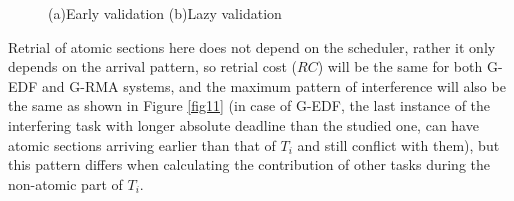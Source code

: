 \documentclass[a4paper,english]{article}
\begin{document}
%
\begin{figure}
\centering{}\caption{\label{fig12}(a)Early validation (b)Lazy validation}

\end{figure}


Retrial of atomic sections here does not depend on the scheduler,
rather it only depends on the arrival pattern, so retrial
cost ($RC$) will be the same for both G-EDF and G-RMA
systems, and the maximum pattern of interference will also be the
same as shown in Figure \ref{fig11} (in case of G-EDF, the last instance of the interfering task with longer absolute deadline than the studied one, can have atomic sections arriving earlier than that of $T_i$ and still conflict with them), but this pattern differs when calculating the contribution of other tasks during the non-atomic part of $T_{i}$.
\end{document}
